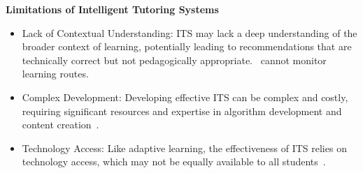 \textbf{Limitations of Intelligent Tutoring Systems}
\begin{itemize}
    \item Lack of Contextual Understanding: ITS may lack a deep understanding of the broader context of learning, potentially leading to recommendations that are technically correct but not pedagogically appropriate.~\citet{Garrido2009} cannot monitor learning routes.
    
    \item Complex Development: Developing effective ITS can be complex and costly, requiring significant resources and expertise in algorithm development and content creation~\cite{Corbett1997}.
    
    \item Technology Access: Like adaptive learning, the effectiveness of ITS relies on technology access, which may not be equally available to all students~\cite{Kabudi2021}.
\end{itemize}

